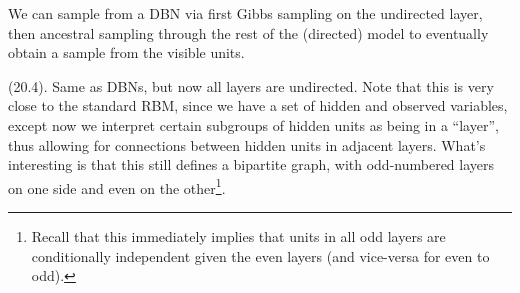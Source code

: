 \documentclass[11pt]{article}
\newcommand\myspace[1][]{\vspace{#1\bigskipamount}}
\newcommand\p{\Needspace{10\baselineskip} \noindent}
\begin{document}
\begin{center}
\end{center}
We can sample from a DBN via first Gibbs sampling on the undirected layer, then ancestral sampling through the rest of the (directed) model to eventually obtain a sample from the visible units.

\myspace 
\p {} (20.4). Same as DBNs, but now all layers are undirected. Note that this is very close to the standard RBM, since we have a set of hidden and observed variables, except now we interpret certain subgroups of hidden units as being in a ``layer'', thus allowing for connections between hidden units in adjacent layers. What's interesting is that this still defines a bipartite graph, with odd-numbered layers on one side and even on the other\footnote{Recall that this immediately implies that units in all odd layers are conditionally independent given the even layers (and vice-versa for even to odd).}. \\
\end{document}
